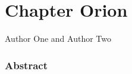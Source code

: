 \chapter[Orion chapter entry for ToC]{Chapter Orion}

\hyphenation{}

{\large\color{eurgreen} Author One and Author Two}
\emptyline
\emptyline
\emptyline


\subsection*{Abstract}
\blindtext
\clearpage

\blindmathpaper
